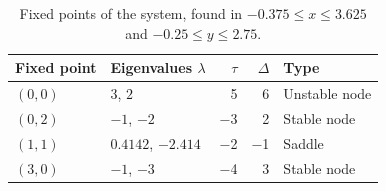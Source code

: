 \begin{table}
\centering
\caption{Fixed points of the system, found in $-0.375 \le x \le 3.625$ and $-0.25 \le y \le 2.75$.}
\label{tab:rabbits-vs-sheep-fixed-points}
\begin{tabular}{@{}llrrl@{}}
\toprule
Fixed point & Eigenvalues $\lambda$ & $\tau$ & $\Delta$ & Type \\
\midrule
$(\num{0}, \num{0})$ & $\num{3}$, $\num{2}$ & \num{5} & \num{6} & Unstable node \\
$(\num{0}, \num{2})$ & $\num{-1}$, $\num{-2}$ & \num{-3} & \num{2} & Stable node \\
$(\num{1}, \num{1})$ & $\num{0.4142}$, $\num{-2.414}$ & \num{-2} & \num{-1} & Saddle \\
$(\num{3}, \num{0})$ & $\num{-1}$, $\num{-3}$ & \num{-4} & \num{3} & Stable node \\
\bottomrule
\end{tabular}
\end{table}

